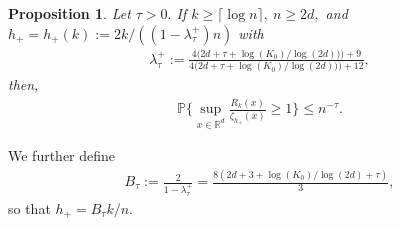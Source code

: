 \documentclass[10pt]{article}
\newcommand{\PP}{\mathbb{P}}
\newcommand{\RR}{\mathbb{R}}
\newtheorem{proposition}[theorem]{Proposition}
\begin{document}
\begin{proposition}
    \label{prop.neighbours.distance.bound.zeta}
    Let $\tau > 0.$ If $k \geq \lceil \log n\rceil, \ n \geq 2d,$ and $h_+ = h_+(k) := 2k/((1 - \lambda^+_\tau)n)$ with
    \begin{align*}
        \lambda_\tau^+ := \frac{4\big(2d + \tau + \log(K_0)/\log(2d))\big) + 9}{4\big(2d + \tau + \log(K_0)/\log(2d))\big) + 12},
    \end{align*} 
    then,
    \begin{align*}
        \PP\Bigg\{\sup_{x \in \RR^d}\frac{R_k(x)}{\zeta_{h_+}(x)} \geq 1\Bigg\} \leq n^{-\tau}.
    \end{align*}
\end{proposition}
We further define 
\begin{align}
    \label{eq.def.btau}
    B_\tau := \frac{2}{1 - \lambda_\tau^+} = \frac{8(2d + 3 + \log(K_0)/\log(2d) + \tau)}{3},
\end{align}
so that $h_+ = B_\tau k/n.$
\end{document}
